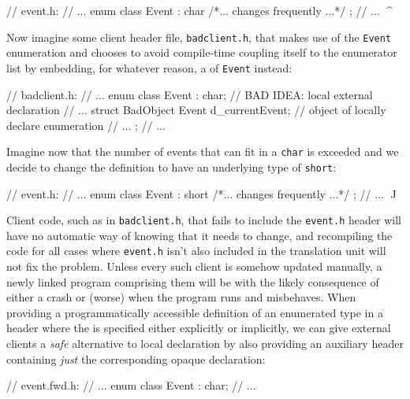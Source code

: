 \begin{emcppslisting}
// event.h:
// ...
enum class Event : char { /*... changes frequently ...*/ };
// ...             ^^^^
\end{emcppslisting}

\noindent Now imagine some client header file, \lstinline!badclient.h!, that makes
use of the \lstinline!Event! enumeration and chooses to avoid compile-time
coupling itself to the enumerator list by
embedding, for whatever reason, a  of \lstinline!Event! instead:

\begin{emcppslisting}
// badclient.h:
// ...
enum class Event : char;  // BAD IDEA: local external declaration
// ...
struct BadObject
{
    Event d_currentEvent;  // object of locally declare enumeration
    // ...
};
// ...
\end{emcppslisting}

\noindent Imagine now that the number of events that can fit in a \lstinline!char! is
exceeded and we decide to change the definition to have an underlying
type of \lstinline!short!:

\begin{emcppslisting}
// event.h:
// ...
enum class Event : short { /*... changes frequently ...*/ };
// ...             ^^^^^
\end{emcppslisting}

\noindent Client code, such as in \lstinline!badclient.h!, that fails to include the
\lstinline!event.h! header will have no automatic way of knowing that it
needs to change, and recompiling the code for all cases where
\lstinline!event.h! isn't also included in the translation unit will not
fix the problem. Unless every such client is somehow updated manually, a
newly linked program comprising them will be \emcppsgloss{IFNDR} with the likely
consequence of either a crash or (worse) when the program runs and
misbehaves. When providing a programmatically accessible definition of
an enumerated type in a header where the \emcppsgloss{underlying type} is
specified either explicitly or implicitly, we can give external
clients a \emph{safe} alternative to local declaration by also providing
an auxiliary header containing \emph{just} the corresponding opaque
declaration:

\begin{emcppslisting}[emcppsbatch=e7]
// event.fwd.h:
// ...
enum class Event : char;
// ...
\end{emcppslisting}

